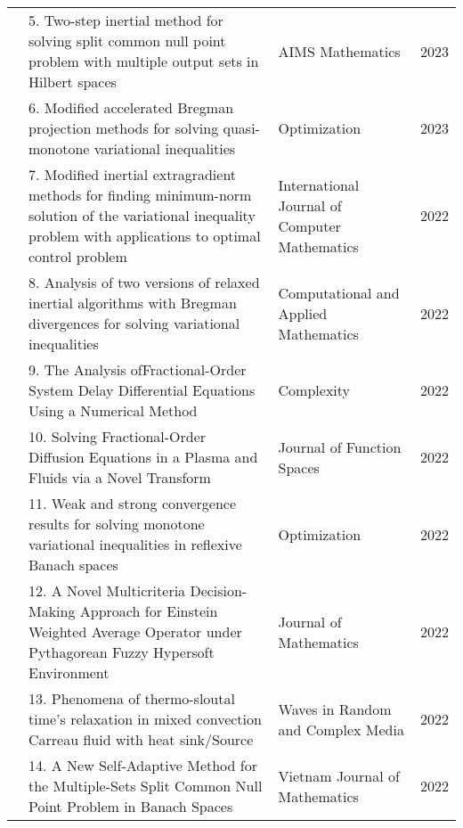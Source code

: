 {{\begin{center}
\begin{longtable}{|p{}|>{\raggedright}p{}|>{\raggedright}p{}|p{}|}
&5. Two-step inertial method
for solving split common
null point problem with
multiple output sets in
Hilbert spaces
&AIMS Mathematics&
2023 \\ \cline{2-4}	

&6. Modified accelerated \newline   
Bregman projection 
methods for solving quasi- 
monotone variational  
inequalities
&Optimization &
2023 \\ \cline{2-4}	

&7. Modified inertial 
extragradient methods for 
finding minimum-norm solution
of the variational inequality
problem with applications to
optimal control problem
&International 
Journal of Computer 
Mathematics&
2022 \\ \cline{2-4}

&8. Analysis of two \newline versions of
relaxed inertial algorithms
with Bregman divergences 
for solving variational 
inequalities
&Computational and 
Applied Mathematics
&2022\\\cline{2-4}	

&9. The Analysis of\newline  Fractional-Order System Delay 
Differential Equations
Using a Numerical Method					
&Complexity
&2022\\ \cline{2-4}	

&10.	Solving Fractional-Order 
Diffusion Equations in a 
Plasma and Fluids via a
Novel Transform 
&Journal of
Function Spaces
&2022 \\ \cline{2-4}

&11. Weak and strong \newline
convergence results for
solving monotone variational
inequalities in reflexive
Banach spaces
&Optimization
&2022 \\ \cline{2-4}

&12. A Novel Multicriteria \newline
Decision-Making 
Approach for Einstein 
Weighted Average
Operator under
Pythagorean Fuzzy
Hypersoft Environment
&Journal of Mathematics
&2022 \\ \cline{2-4}		

&13. Phenomena of thermo-sloutal time’s relaxation in
mixed convection Carreau fluid with heat sink/Source						
&Waves in Random and Complex Media
&2022 \\ \cline{2-4}

&14. A New Self-Adaptive\newline
Method for the Multiple-Sets Split Common Null 
Point Problem in Banach Spaces
&Vietnam Journal of Mathematics	
&2022 
\\ \cline{2-4}
	

\end{longtable}
\end{center}}}
